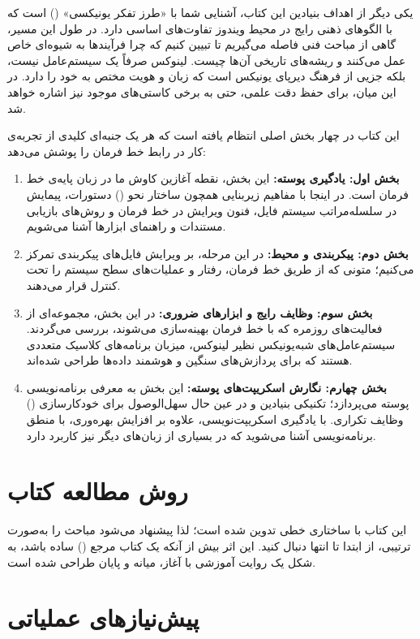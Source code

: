 یکی دیگر از اهداف بنیادین این کتاب، آشنایی شما با «طرز تفکر یونیکسی» () است که با الگوهای ذهنی رایج در محیط ویندوز تفاوت‌های اساسی دارد. در طول این مسیر، گاهی از مباحث فنی فاصله می‌گیریم تا تبیین کنیم که چرا فرآیندها به شیوه‌ای خاص عمل می‌کنند و ریشه‌های تاریخی آن‌ها چیست. لینوکس صرفاً یک سیستم‌عامل نیست، بلکه جزیی از فرهنگ دیرپای یونیکس است که زبان و هویت مختص به خود را دارد. در این میان، برای حفظ دقت علمی، حتی به برخی کاستی‌های موجود نیز اشاره خواهد شد.

این کتاب در چهار بخش اصلی انتظام یافته است که هر یک جنبه‌ای کلیدی از تجربه‌ی کار در رابط خط فرمان را پوشش می‌دهد:

\begin{enumerate}
  \item \textbf{بخش اول: یادگیری پوسته:} این بخش، نقطه آغازین کاوش ما در زبان پایه‌ی خط فرمان است. در اینجا با مفاهیم زیربنایی همچون ساختار نحو () دستورات، پیمایش در سلسله‌مراتب سیستم فایل، فنون ویرایش در خط فرمان و روش‌های بازیابی مستندات و راهنمای ابزارها آشنا می‌شویم.
  \item \textbf{بخش دوم: پیکربندی و محیط:} در این مرحله، بر ویرایش فایل‌های پیکربندی تمرکز می‌کنیم؛ متونی که از طریق خط فرمان، رفتار و عملیات‌های سطح سیستم را تحت کنترل قرار می‌دهند.
  \item \textbf{بخش سوم: وظایف رایج و ابزارهای ضروری:} در این بخش، مجموعه‌ای از فعالیت‌های روزمره که با خط فرمان بهینه‌سازی می‌شوند، بررسی می‌گردند. سیستم‌عامل‌های شبه‌یونیکس نظیر لینوکس، میزبان برنامه‌های کلاسیک متعددی هستند که برای پردازش‌های سنگین و هوشمند داده‌ها طراحی شده‌اند.
  \item \textbf{بخش چهارم: نگارش اسکریپت‌های پوسته:} این بخش به معرفی برنامه‌نویسی پوسته می‌پردازد؛ تکنیکی بنیادین و در عین حال سهل‌الوصول برای خودکارسازی () وظایف تکراری. با یادگیری اسکریپت‌نویسی، علاوه بر افزایش بهره‌وری، با منطق برنامه‌نویسی آشنا می‌شوید که در بسیاری از زبان‌های دیگر نیز کاربرد دارد.
\end{enumerate}

\section*{روش مطالعه کتاب}

این کتاب با ساختاری خطی تدوین شده است؛ لذا پیشنهاد می‌شود مباحث را به‌صورت ترتیبی، از ابتدا تا انتها دنبال کنید. این اثر بیش از آنکه یک کتاب مرجع () ساده باشد، به شکل یک روایت آموزشی با آغاز، میانه و پایان طراحی شده است.

\section*{پیش‌نیازهای عملیاتی}

